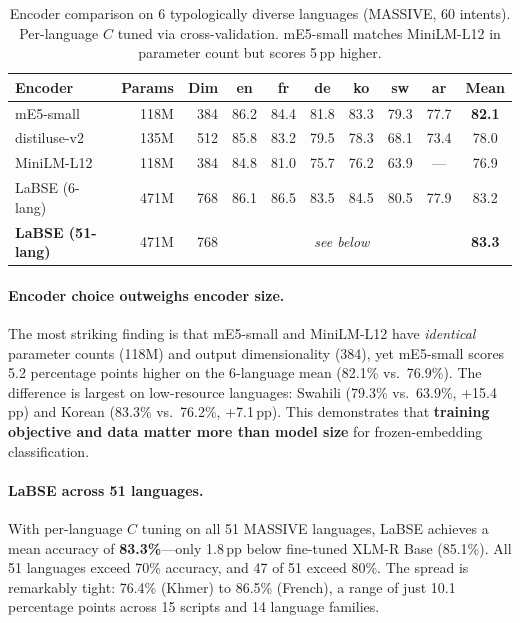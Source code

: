 \documentclass[11pt]{article}
\begin{document}
\begin{table}[t]
\centering
\caption{Encoder comparison on 6 typologically diverse languages (MASSIVE, 60 intents). Per-language $C$ tuned via cross-validation. mE5-small matches MiniLM-L12 in parameter count but scores 5\,pp higher.}
\label{tab:encoder_sweep}
\small
\begin{tabular}{lrrccccccc}
\toprule
Encoder & Params & Dim & en & fr & de & ko & sw & ar & Mean \\
\midrule
mE5-small & 118M & 384 & 86.2 & 84.4 & 81.8 & 83.3 & 79.3 & 77.7 & \textbf{82.1} \\
distiluse-v2 & 135M & 512 & 85.8 & 83.2 & 79.5 & 78.3 & 68.1 & 73.4 & 78.0 \\
MiniLM-L12 & 118M & 384 & 84.8 & 81.0 & 75.7 & 76.2 & 63.9 & --- & 76.9 \\
\midrule
LaBSE (6-lang) & 471M & 768 & 86.1 & 86.5 & 83.5 & 84.5 & 80.5 & 77.9 & 83.2 \\
\textbf{LaBSE (51-lang)} & 471M & 768 & \multicolumn{6}{c}{\textit{see below}} & \textbf{83.3} \\
\bottomrule
\end{tabular}
\end{table}

\paragraph{Encoder choice outweighs encoder size.} The most striking finding is that mE5-small and MiniLM-L12 have \textit{identical} parameter counts (118M) and output dimensionality (384), yet mE5-small scores 5.2 percentage points higher on the 6-language mean (82.1\% vs.\ 76.9\%). The difference is largest on low-resource languages: Swahili (79.3\% vs.\ 63.9\%, +15.4\,pp) and Korean (83.3\% vs.\ 76.2\%, +7.1\,pp). This demonstrates that \textbf{training objective and data matter more than model size} for frozen-embedding classification.

\paragraph{LaBSE across 51 languages.} With per-language $C$ tuning on all 51 MASSIVE languages, LaBSE achieves a mean accuracy of \textbf{83.3\%}---only 1.8\,pp below fine-tuned XLM-R Base (85.1\%). All 51 languages exceed 70\% accuracy, and 47 of 51 exceed 80\%. The spread is remarkably tight: 76.4\% (Khmer) to 86.5\% (French), a range of just 10.1 percentage points across 15 scripts and 14 language families.
\end{document}
